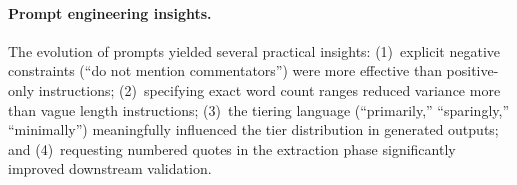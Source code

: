 \paragraph{Prompt engineering insights.}
The evolution of prompts yielded several practical insights: (1)~explicit negative constraints (``do not mention commentators'') were more effective than positive-only instructions; (2)~specifying exact word count ranges reduced variance more than vague length instructions; (3)~the tiering language (``primarily,'' ``sparingly,'' ``minimally'') meaningfully influenced the tier distribution in generated outputs; and (4)~requesting numbered quotes in the extraction phase significantly improved downstream validation.

